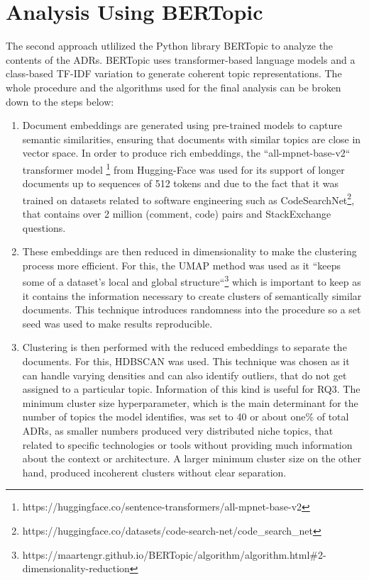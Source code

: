     \section{Analysis Using BERTopic}
        The second approach utlilized the Python library BERTopic \cite{bertTopic} to analyze the contents of the ADRs. BERTopic uses transformer-based language models and a class-based TF-IDF variation to generate coherent topic representations. The whole procedure and the algorithms used for the final analysis can be broken down to the steps below:

        \begin{enumerate}
            \item Document embeddings are generated using pre-trained models to capture semantic similarities, ensuring that documents with similar topics are close in vector space. In order to produce rich embeddings, the ``all-mpnet-base-v2`` transformer model \footnote{https://huggingface.co/sentence-transformers/all-mpnet-base-v2} from Hugging-Face was used for its support of longer documents up to sequences of 512 tokens and due to the fact that it was trained on datasets related to software engineering such as CodeSearchNet\footnote{https://huggingface.co/datasets/code-search-net/code\_search\_net}, that contains over 2 million (comment, code) pairs and StackExchange questions.
            
            \item These embeddings are then reduced in dimensionality to make the clustering process more efficient. For this, the UMAP method was used as it ``keeps some of a dataset's local and global structure``\footnote{https://maartengr.github.io/BERTopic/algorithm/algorithm.html\#2-dimensionality-reduction} which is important to keep as it contains the information necessary to create clusters of semantically similar documents. This technique introduces randomness into the procedure so a set seed was used to make results reproducible.

            \item Clustering is then performed with the reduced embeddings to separate the documents. For this, HDBSCAN was used. This technique was chosen as it can handle varying densities and can also identify outliers, that do not get assigned to a particular topic. Information of this kind is useful for RQ3. The minimum cluster size hyperparameter, which is the main determinant for the number of  topics the model identifies, was set to 40 or about one\% of total ADRs, as smaller numbers produced very distributed niche topics, that related to specific technologies or tools without providing much information about the context or architecture. A larger minimum cluster size on the other hand, produced incoherent clusters without clear separation.


\end{enumerate}
